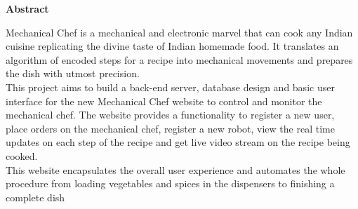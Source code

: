 \vspace{1.0in}
\begin{titlepage}
\begin{center}
    \LARGE{\bf Abstract}
\end{center}
{\normalsize Mechanical Chef is a mechanical and electronic marvel that can cook any Indian cuisine replicating the divine taste of Indian homemade food. It translates an algorithm of encoded steps for a recipe into mechanical movements and prepares the dish with utmost precision. \\[0.1in]
This project aims to build a back-end server, database design and basic user interface for the new Mechanical Chef website to control and monitor the mechanical chef. The website provides a functionality to register a new user, place orders on the mechanical chef, register a new robot, view the real time updates on each step of the recipe and get live video stream on the recipe being cooked. \\[0.1in]
This website encapsulates the overall user experience and automates the whole procedure from loading vegetables and spices in the dispensers to finishing a complete dish}
\end{titlepage}

